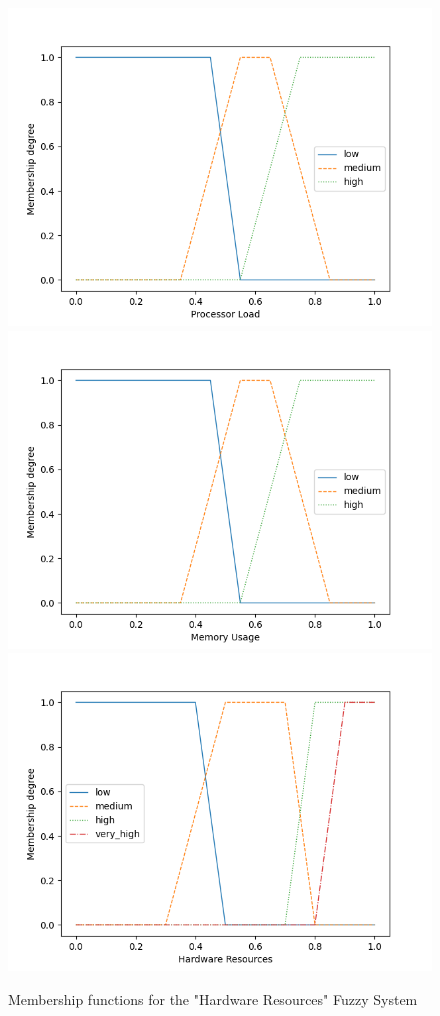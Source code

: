 \begin{figure}[!htb]
    \centering
    \hspace*{-1cm}

    \includegraphics[width=.33\textwidth]{images/plots/ProcessorLoad.png}\hfill
    \includegraphics[width=.33\textwidth]{images/plots/MemoryUsage.png}\hfill
    \includegraphics[width=.33\textwidth]{images/plots/CpuMemCLP.png}

    \hspace*{-1cm}
    \caption{Membership functions for the "Hardware Resources" Fuzzy System}
    \label{fig:FS_HDR_FSETS}
\end{figure}

